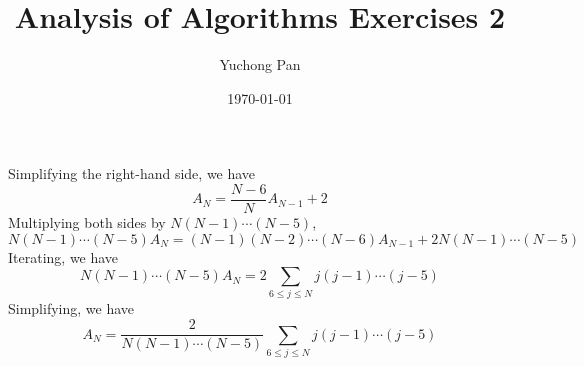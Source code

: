 \documentclass[letterpaper, reqno,11pt]{article}
\begin{document}
\title{Analysis of Algorithms Exercises 2}
\author{Yuchong Pan}
\date{\today}
\newtheorem{thm}{Theorem}[section]
\newtheorem{lemma}{Lemma}[section]
\newtheorem{defn}{Definition}[section]
\maketitle
%

 Simplifying the right-hand side, we have
\begin{equation*}
    A_N=\frac{N-6}{N}A_{N-1}+2
\end{equation*}
Multiplying both sides by $N(N-1)\cdots (N-5)$,
\begin{equation*}
    N(N-1)\cdots (N-5)A_N=(N-1)(N-2)\cdots (N-6)A_{N-1}+2N(N-1)\cdots (N-5)
\end{equation*}
Iterating, we have
\begin{equation*}
    N(N-1)\cdots (N-5)A_N=2\sum_{6\leq j\leq N}j(j-1)\cdots (j-5)
\end{equation*}
Simplifying, we have
\begin{equation*}
    A_N=\frac{2}{N(N-1)\cdots (N-5)}\sum_{6\leq j\leq N}j(j-1)\cdots (j-5)
\end{equation*}
\end{document}
